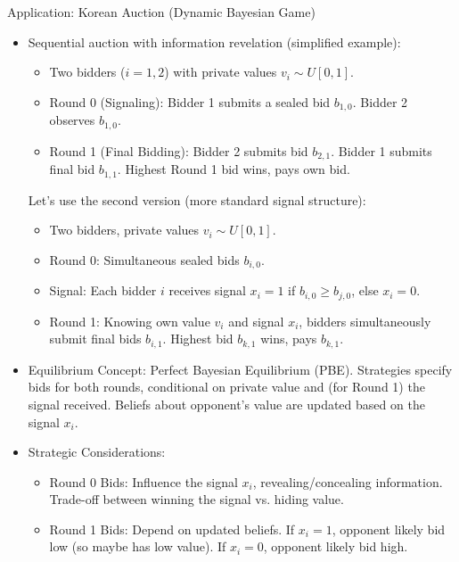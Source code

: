 \documentclass[10pt]{beamer}
\begin{document}

\begin{frame}{Application: Korean Auction (Dynamic Bayesian Game)}
    \begin{itemize}
        \item Sequential auction with information revelation (simplified example):
        \begin{itemize}
            \item Two bidders ($i=1,2$) with private values $v_i \sim U[0,1]$.
            \item Round 0 (Signaling): Bidder 1 submits a sealed bid $b_{1,0}$. Bidder 2 observes $b_{1,0}$.
            \item Round 1 (Final Bidding): Bidder 2 submits bid $b_{2,1}$. Bidder 1 submits final bid $b_{1,1}$. Highest Round 1 bid wins, pays own bid.
        \end{itemize}
        Let's use the second version (more standard signal structure):
         \begin{itemize}
             \item Two bidders, private values $v_i \sim U[0,1]$.
             \item Round 0: Simultaneous sealed bids $b_{i,0}$.
             \item Signal: Each bidder $i$ receives signal $x_i=1$ if $b_{i,0} \geq b_{j,0}$, else $x_i=0$.
             \item Round 1: Knowing own value $v_i$ and signal $x_i$, bidders simultaneously submit final bids $b_{i,1}$. Highest bid $b_{k,1}$ wins, pays $b_{k,1}$.
         \end{itemize}

        \item Equilibrium Concept: Perfect Bayesian Equilibrium (PBE). Strategies specify bids for both rounds, conditional on private value and (for Round 1) the signal received. Beliefs about opponent's value are updated based on the signal $x_i$.

        \item Strategic Considerations:
         \begin{itemize}
             \item Round 0 Bids: Influence the signal $x_i$, revealing/concealing information. Trade-off between winning the signal vs. hiding value.
             \item Round 1 Bids: Depend on updated beliefs. If $x_i=1$, opponent likely bid low (so maybe has low value). If $x_i=0$, opponent likely bid high.
         \end{itemize}


\end{itemize}
\end{frame}
\end{document}
